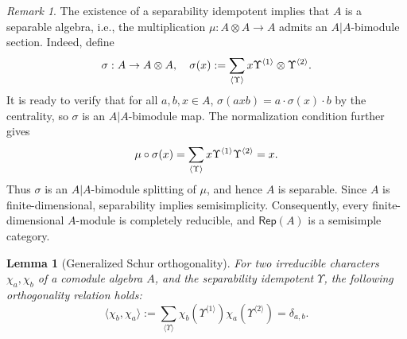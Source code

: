 \documentclass[a4paper,11pt]{article}
\newtheorem{lemma}[theorem]{Lemma}
\theoremstyle{definition}
\theoremstyle{remark}
\newtheorem{remark}[theorem]{Remark}
\newcommand{\Rep}{\mathsf{Rep}}
\begin{document}
\begin{remark} \label{rem:separable-semisimple}
The existence of a separability idempotent implies that $A$ is a separable algebra, i.e., the multiplication $\mu:A\otimes A\to A$ admits an $A|A$-bimodule section. Indeed, define
\begin{equation}
    \notag
    \sigma: A\to  A\otimes A, \quad \sigma(x) := \sum_{\langle\Upsilon\rangle} x\Upsilon^{\langle 1\rangle} \otimes \Upsilon^{\langle 2\rangle}.
\end{equation}
It is ready to verify that for all $a,b,x\in A$, $\sigma(axb) = a\cdot\sigma(x)\cdot b$ by the centrality, so $\sigma$ is an $A|A$-bimodule map.  The normalization condition further gives
\begin{equation}
    \notag
    \mu\circ\sigma(x) = \sum_{\langle\Upsilon\rangle}
    x\Upsilon^{\langle 1\rangle} \Upsilon^{\langle 2\rangle} = x.
\end{equation}
Thus $\sigma$ is an $A|A$-bimodule splitting of $\mu$, and hence $A$ is separable. Since $A$ is finite-dimensional, separability implies semisimplicity. Consequently, every finite-dimensional $A$-module is completely reducible, and $\Rep(A)$ is a semisimple category.
\end{remark}

\begin{lemma}[Generalized Schur orthogonality] \label{lem:Schur-orth}
For two irreducible characters $\chi_a,\chi_b$ of a comodule algebra $A$, and the separability idempotent $\Upsilon$, the following orthogonality relation holds:
\begin{equation}
\langle \chi_b,\chi_a\rangle
:=
\sum_{\langle \Upsilon\rangle}
\chi_b(\Upsilon^{\langle 1\rangle})
\chi_a(\Upsilon^{\langle 2\rangle})
=
\delta_{a,b}.
\end{equation}
\end{lemma}
\end{document}
